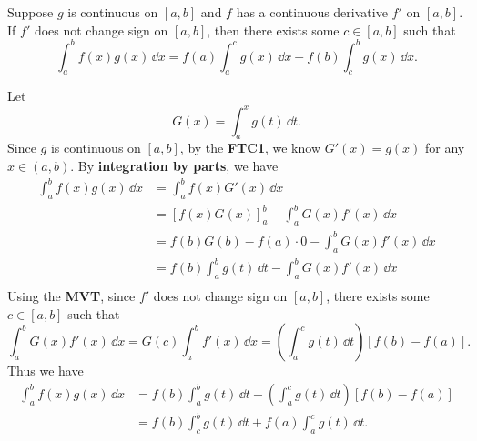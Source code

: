 	\begin{theoremenv}
		Suppose $g$ is continuous on $[a,b]$ and $f$ has a continuous derivative $f'$ on $[a,b]$.  If $f'$ does not change sign on $[a,b]$, then there exists some $c\in [a,b]$ such that
		\[
		\int_a^b f(x) g(x)\, \dd x = f(a) \int_a^c g(x)\, \dd x + f(b) \int_c^b g(x)\, \dd x.
		\]
	\end{theoremenv}
	\begin{proofenv}
		Let
		\[
		G(x) = \int_a^x g(t)\, \dd t.
		\]
		Since $g$ is continuous on $[a,b]$, by the \textbf{FTC1}, we know $G'(x)=g(x)$ for any $x\in (a,b)$. By \textbf{integration by parts}, we have
		\[
		\begin{aligned}
			\int_a^b f(x) g(x)\, \dd x &= \int_a^b f(x) G'(x)\, \dd x\\[6pt]
			&= \left[ f(x) G(x) \right]_a^b - \int_a^b G(x) f'(x)\, \dd x\\[6pt]
			&= f(b) G(b) - f(a) \cdot 0 - \int_a^b G(x) f'(x)\, \dd x\\[6pt]
			&= f(b) \int_a^b g(t)\, \dd t - \int_a^b G(x) f'(x)\, \dd x\\[6pt]
		\end{aligned}
		\]
		Using the \textbf{MVT}, since $f'$ does not change sign on $[a,b]$, there exists some $c\in [a,b]$ such that
		\[
		\int_a^b G(x) f'(x)\, \dd x = G(c) \int_a^b f'(x)\, \dd x =  \left( \int_a^c g(t)\, \dd t \right) [f(b)-f(a)].
		\]
		Thus we have
		\[
		\begin{aligned}
			\int_a^b f(x) g(x)\, \dd x &= f(b) \int_a^b g(t)\, \dd t - \left( \int_a^c g(t)\, \dd t \right) [f(b)-f(a)]\\[6pt]
			&= f(b) \int_c^b g(t)\, \dd t + f(a) \int_a^c g(t)\, \dd t.
		\end{aligned}
		\]
	\end{proofenv}

	\newpage